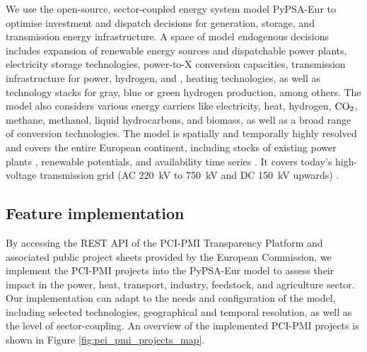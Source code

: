 \documentclass[final,5p,times,twocolumn]{elsarticle}
\let\autocite\cite
\begin{document}
We use the open-source, sector-coupled energy system model PyPSA-Eur \cite{neumannPotentialRoleHydrogen2023,frysztackiComparisonClusteringMethods2022,glaumOffshorePowerHydrogen2024,horschPyPSAEurOpenOptimisation2018} to optimise investment and dispatch decisions for generation, storage, and transmission energy infrastructure. 
A space of model endogenous decisions includes expansion of renewable energy sources and dispatchable power plants, electricity storage technologies, power-to-X conversion capacities, transmission infrastructure for power, hydrogen, and , heating technologies, as well as technology stacks for gray, blue or green hydrogen production, among others. 
The model also considers various energy carriers like electricity, heat, hydrogen, $\ce{CO2}$, methane, methanol, liquid hydrocarbons, and biomass, as well as a broad range of conversion technologies.
The model is spatially and temporally highly resolved and covers the entire European continent, including stocks of existing power plants \autocite{gotzensPerformingEnergyModelling2019}, renewable potentials, and availability time series \autocite{hofmannAtliteLightweightPython2021}. It covers today's high-voltage transmission grid (AC \SI{220}{kV} to \SI{750}{kV} and DC \SI{150}{kV} upwards) \autocite{xiongModellingHighVoltageGrid2024}.

\subsection{Feature implementation}
\label{sec:feature_implementation}

By accessing the REST API of the PCI-PMI Transparency Platform \autocite{europeancommissionPCIPMITransparencyPlatform2024} and associated public project sheets provided by the European Commission, we implement the PCI-PMI projects into the PyPSA-Eur model to assess their impact in the power, heat, transport, industry, feedstock, and agriculture sector. Our implementation can adapt to the needs and configuration of the model, including selected technologies, geographical and temporal resolution, as well as the level of sector-coupling. An overview of the implemented PCI-PMI projects is shown in Figure \ref{fig:pci_pmi_projects_map}.
\end{document}
